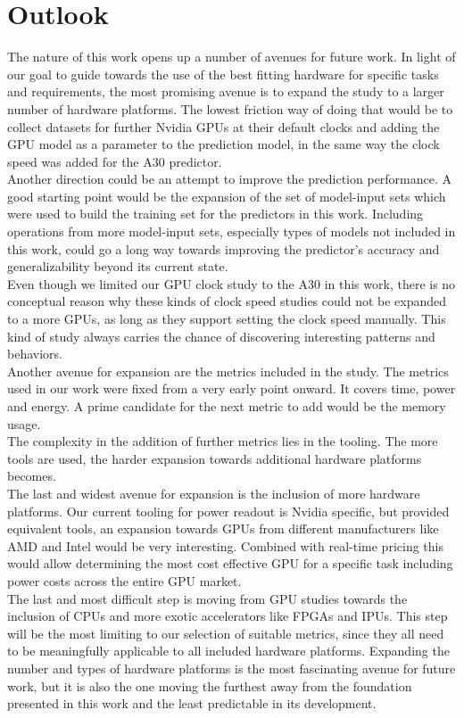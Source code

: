 \section{Outlook}
The nature of this work opens up a number of avenues for future work. In light of our goal to guide towards the use of the best fitting hardware for specific tasks and requirements, the most promising avenue is to expand the study to a larger number of hardware platforms. The lowest friction way of doing that would be to collect datasets for further Nvidia GPUs at their default clocks and adding the GPU model as a parameter to the prediction model, in the same way the clock speed was added for the A30 predictor. \\
Another direction could be an attempt to improve the prediction performance.
A good starting point would be the expansion of the set of model-input sets which were used to build the training set for the predictors in this work. Including operations from more model-input sets, especially types of models not included in this work, could go a long way towards improving the predictor's accuracy and generalizability beyond its current state. \\
Even though we limited our GPU clock study to the A30 in this work, there is no conceptual reason why these kinds of clock speed studies could not be expanded to a more GPUs, as long as they support setting the clock speed manually. This kind of study always carries the chance of discovering interesting patterns and behaviors.\\
Another avenue for expansion are the metrics included in the study. The metrics used in our work were fixed from a very early point onward. It covers time, power and energy. A prime candidate for the next metric to add would be the memory usage. \\
The complexity in the addition of further metrics lies in the tooling. The more tools are used, the harder expansion towards additional hardware platforms becomes. \\
The last and widest avenue for expansion is the inclusion of more hardware platforms. Our current tooling for power readout is Nvidia specific, but provided equivalent tools, an expansion towards GPUs from different manufacturers like AMD and Intel would be very interesting. Combined with real-time pricing this would allow determining the most cost effective GPU for a specific task including power costs across the entire GPU market. \\
The last and most difficult step is moving from GPU studies towards the inclusion of CPUs and more exotic accelerators like FPGAs and IPUs. This step will be the most limiting to our selection of suitable metrics, since they all need to be meaningfully applicable to all included hardware platforms. Expanding the number and types of hardware platforms is the most fascinating avenue for future work, but it is also the one moving the furthest away from the foundation presented in this work and the least predictable in its development. \\

